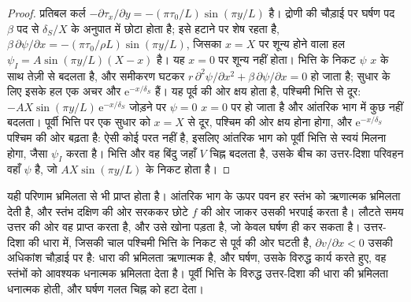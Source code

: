 \begin{proof}
प्रतिबल कर्ल $-\partial\tau_x/\partial y = -(\pi\tau_0/L)\sin(\pi
y/L)$ है। द्रोणी की चौड़ाई पर घर्षण पद
$\beta$ पद से $\delta_S/X$ के अनुपात में छोटा होता है; इसे हटाने पर  शेष रहता है,
$\beta\,\partial\psi/\partial x = -(\pi\tau_0/\rho L)\sin(\pi y/L)$, जिसका $x = X$ पर शून्य होने वाला हल
$\psi_I = A\sin(\pi y/L)(X - x)$ है। यह
$x = 0$ पर शून्य नहीं होता। भित्ति के निकट $\psi$ $x$ के साथ तेज़ी से बदलता है, और
समीकरण घटकर $r\,\partial^2\psi/\partial x^2 + \beta\,\partial\psi/
\partial x = 0$ हो जाता है; सुधार के लिए इसके हल एक अचर और
$\mathrm e^{-x/\delta_S}$ हैं। यह पूर्व की ओर क्षय होता है, पश्चिमी
भित्ति से दूर: $-AX\sin(\pi y/L)\,\mathrm e^{-x/\delta_S}$ जोड़ने पर $\psi = 0$
$x = 0$ पर हो जाता है और आंतरिक भाग में कुछ नहीं बदलता। पूर्वी भित्ति पर
एक सुधार को $x = X$ से दूर, पश्चिम की ओर क्षय होना होगा, और
$\mathrm e^{-x/\delta_S}$ पश्चिम की ओर बढ़ता है: ऐसी कोई परत नहीं है, इसलिए
आंतरिक भाग को पूर्वी भित्ति से स्वयं मिलना होगा, जैसा $\psi_I$ करता है।
भित्ति और वह बिंदु जहाँ $V$ चिह्न बदलता है, उसके बीच का
उत्तर-दिशा परिवहन वहाँ $\psi$ है, जो $AX\sin(\pi y/L)$ के निकट होता है।
\end{proof}

यही परिणाम भ्रमिलता से भी प्राप्त होता है। आंतरिक भाग के ऊपर पवन हर स्तंभ को
ऋणात्मक भ्रमिलता देती है, और स्तंभ दक्षिण की ओर सरककर
छोटे $f$ की ओर जाकर उसकी भरपाई करता है। लौटते समय उत्तर की ओर वह  प्राप्त करता है,
और उसे खोना पड़ता है, जो केवल घर्षण ही कर सकता है।
उत्तर-दिशा की धारा में, जिसकी चाल पश्चिमी भित्ति के निकट से पूर्व की ओर घटती है, $\partial
v/\partial x < 0$ उसकी अधिकांश चौड़ाई पर है: धारा की भ्रमिलता ऋणात्मक है, और घर्षण, उसके विरुद्ध कार्य करते हुए,
वह स्तंभों को आवश्यक धनात्मक भ्रमिलता देता है। पूर्वी भित्ति के विरुद्ध उत्तर-दिशा की
धारा की भ्रमिलता धनात्मक होती, और
घर्षण गलत चिह्न को हटा देता।


